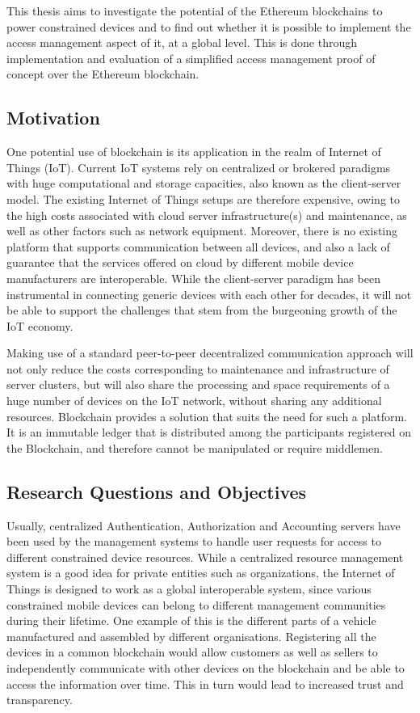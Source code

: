 \documentclass[english]{tktltiki}
\begin{document}
This thesis aims to investigate the potential of the Ethereum blockchains to power constrained devices and to find out whether it is possible to implement the access management aspect of it, at a global level. This is done through implementation and evaluation of a simplified access management proof of concept over the Ethereum blockchain.


\subsection{Motivation}

One potential use of blockchain is its application in the realm of Internet of Things (IoT). Current IoT systems rely on centralized or brokered paradigms with huge computational and storage capacities, also known as the client-server model. The existing Internet of Things setups are therefore expensive, owing to the high costs associated with cloud server infrastructure(s) and maintenance, as well as other factors such as network equipment. Moreover, there is no existing platform that supports communication between all devices, and also a lack of guarantee that the services offered on cloud by different mobile device manufacturers are interoperable. While the client-server paradigm has been instrumental in connecting generic devices with each other for decades, it will not be able to support the challenges that stem from the burgeoning growth of the IoT economy.


Making use of a standard peer-to-peer decentralized communication approach will not only reduce the costs corresponding to maintenance and infrastructure of server clusters, but will also share the processing and space requirements of a huge number of devices on the IoT network, without sharing any additional resources. Blockchain provides a solution that suits the need for such a platform. It is an immutable ledger that is distributed among the participants registered on the Blockchain, and therefore cannot be manipulated or require middlemen. 

\subsection{Research Questions and Objectives}

Usually, centralized Authentication, Authorization and Accounting servers \cite{aaa} have been used by the management systems to handle user requests for access to different constrained device resources. While a centralized resource management system is a good idea for private entities such as organizations, the Internet of Things is designed to work as a global interoperable system, since various constrained mobile devices can belong to different management communities during their lifetime. One example of this is the different parts of a vehicle manufactured and assembled by different organisations. Registering all the devices in a common blockchain would allow customers as well as sellers to independently communicate with other devices on the blockchain and be able to access the information over time. This in turn would lead to increased trust and transparency.
\end{document}
